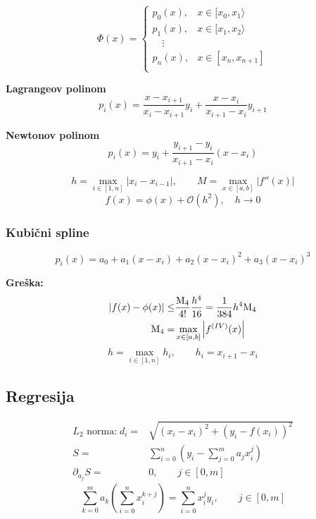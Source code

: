 \vspace{-0.8cm}
\begingroup
\makeatletter
\@totalleftmargin=-1cm
\begin{multicols}{2}

\vspace*{0pt}
$$
\Phi(x)=\begin{cases}
    p_0(x),&x\in[x_0,x_1\rangle\\
    p_1(x),&x\in[x_1,x_2\rangle\\
    \quad\vdots&\\
    p_n(x),&x\in[x_n,x_{n+1}]\\
\end{cases}
$$
\vspace*{0pt}

\columnbreak
\textbf{Lagrangeov polinom}
$$p_i(x) = \frac{x-x_{i+1}}{x_i-x_{i+1}}y_i + \frac{x-x_i}{x_{i+1}-x_i}y_{i+1}$$

\textbf{Newtonov polinom}
$$p_i(x) = y_i + \frac{y_{i+1}-y_i}{x_{i+1}-x_i}(x-x_i)$$
\end{multicols}
\endgroup

\vspace{-0.5cm}
$$h=\max_{i\in[1,n]}|x_i-x_{i-1}|,\qquad M=\max_{x\in[a,b]}|f''(x)|$$
$$f(x) = \phi(x) + \mathcal{O}(h^2),\quad h\to0$$

\subsubsection{Kubični spline}
$$
p_i(x)=a_0+a_1(x-x_i)+a_2(x-x_i)^2+a_3(x-x_i)^3
$$

\noindent
\textbf{Greška:}
\vspace{-0.4cm}
\begin{align*}
|f(x)-\phi(x)|\leq&\frac{\text{M}_4}{4!}\frac{h^4}{16}={1\over384}h^4\text{M}_4\\
\text{M}_4=&\max_{x\in[a,b]}\left|f^{(IV)}(x)\right|
\end{align*}
$$
h=\max_{i\in[1,n]}h_i,\qquad h_i=x_{i+1}-x_i
$$

\subsection{Regresija}

\begin{align*}
L_2\text{ norma:}\;d_i=&\sqrt{(x_i-x_i)^2+(y_i-f(x_i))^2}\\
S=&\sum_{i=0}^n\left(y_i-\sum_{j=0}^ma_jx_i^j\right)\\
\partial_{a_j}S=&0,\qquad j\in[0,m]
\end{align*}
$$
\sum_{k=0}^ma_k\left(\sum_{i=0}^nx_i^{k+j}\right)=\sum_{i=0}^nx_i^jy_i,\qquad j\in[0,m]
$$

